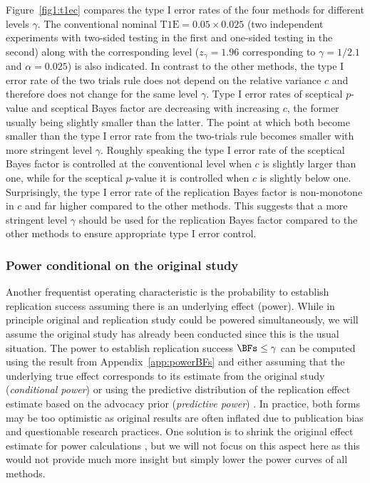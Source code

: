 Figure~\ref{fig1:t1ec} compares the type I error rates of the four methods for
different levels $\gamma$. The conventional nominal
$\text{T1E} = 0.05 \times 0.025$ (two independent experiments with two-sided
testing in the first and one-sided testing in the second) along with the
corresponding level ($z_{\gamma} = 1.96$ corresponding to $\gamma = 1/2.1$ and
$\alpha = 0.025$) is also indicated. In contrast to the other methods, the type
I error rate of the two trials rule does not depend on the relative variance $c$
and therefore does not change for the same level $\gamma$. Type I error rates of
sceptical $p$-value and sceptical Bayes factor are decreasing with increasing
$c$, the former usually being slightly smaller than the latter. The point at
which both become smaller than the type I error rate from the two-trials rule
becomes smaller with more stringent level $\gamma$. Roughly speaking the type I
error rate of the sceptical Bayes factor is controlled at the conventional level
when $c$ is slightly larger than one, while for the sceptical $p$-value it is
controlled when $c$ is slightly below one. Surprisingly, the type I error rate
of the replication Bayes factor is non-monotone in $c$ and far higher compared
to the other methods. This suggests that a more stringent level $\gamma$ should
be used for the replication Bayes factor compared to the other methods to ensure
appropriate type I error control.


\subsubsection{Power conditional on the original study}
Another frequentist operating characteristic is the probability to establish
replication success assuming there is an underlying effect (power). While in
principle original and replication study could be powered simultaneously, we
will assume the original study has already been conducted since this is the
usual situation. The power to establish replication success $\BFs \leq \gamma$
can be computed using the result from Appendix~\ref{app:powerBFs} and either
assuming that the underlying true effect corresponds to its estimate from the
original study (\emph{conditional power}) or using the predictive distribution
of the replication effect estimate based on the advocacy prior (\emph{predictive
  power}) \citep{Spiegelhalter1986b, Micheloud2020}. In practice, both forms may
be too optimistic as original results are often inflated due to publication bias
and questionable research practices. One solution is to shrink the original
effect estimate for power calculations \citep{Pawel2020, Held2021}, but we will
not focus on this aspect here as this would not provide much more insight but
simply lower the power curves of all methods.

